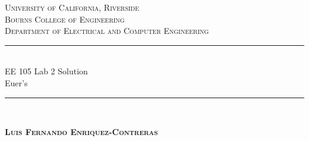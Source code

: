 \documentclass[12pt]{article}
\begin{document}
	\begin{titlepage}
		
		\newcommand{\HRule}{\rule{\linewidth}{0.5mm}} %
		
		\center %
		
		
		\textsc{\LARGE University of California, Riverside}\\[1.5cm] %
		\textsc{\Large Bourns College of Engineering}\\[0.5cm] %
		\textsc{\large Department of Electrical and Computer Engineering}\\[0.5cm] %
		
		
		\HRule \\[0.6cm]
		{\Large EE 105 Lab 2 Solution \\ \normalsize Euer's}\\[0.4cm] %
		\HRule \\[1.0cm]
		
		
		\begin{center} \large
			\medskip
			{\textsc{\textbf{Luis Fernando Enriquez-Contreras} }} 
		\end{center}
		
		
		\begin{center}
			{\large }
		\end{center}
		

\end{titlepage}
\end{document}
